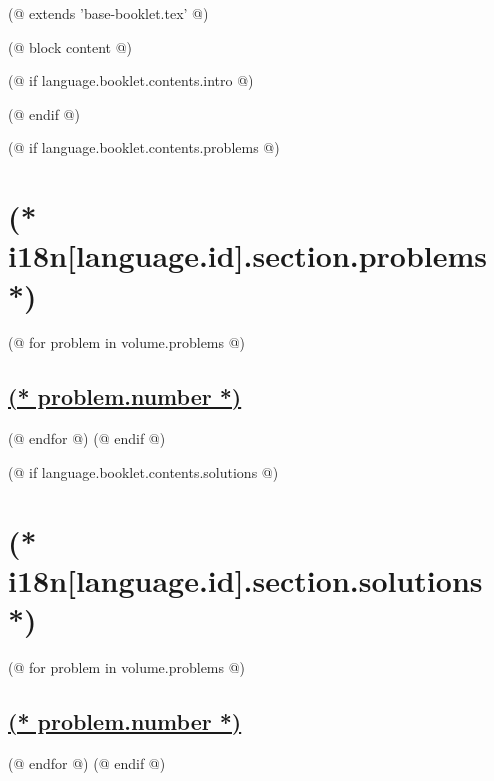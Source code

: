 (@ extends 'base-booklet.tex' @)

(@ block content @)
    \setcounter{volume}{(* volume.number *)}%
    \pagestyle{naboj}

    (@ if language.booklet.contents.intro @)
        \thispagestyle{first}
        \afterpage{\aftergroup\restoregeometry}
        
        \newpage
    (@ endif @)

    (@ if language.booklet.contents.problems @)
        \section{(* i18n[language.id].section.problems *)}
        \pagestyle{problems}
        (@ for problem in volume.problems @)%
            \setcounter{problem}{(* problem.number *)}%
            \hypersetup{linkcolor=black}%
            \subsection{%
                \texorpdfstring{%
                    \hyperref[ssc:(* problem.id *)-answer]{(* problem.number *)}%
                }{%
                    (* problem.number *). (* problem.id *)%
                }%
            }%
            \label{ssc:(* problem.id*)-problem}%
            \hypersetup{linkcolor=colour-link}%
        (@ endfor @)
        \newpage
    (@ endif @)

    (@ if language.booklet.contents.solutions @)
        \section{(* i18n[language.id].section.solutions *)}
        \pagestyle{solutions}
        (@ for problem in volume.problems @)%
            \setcounter{problem}{(* problem.number *)}%
            \setcounter{equation}{0}%
            \setcounter{table}{0}%
            \setcounter{figure}{0}%
            \hypersetup{linkcolor=black}%
            \subsection{%
                \texorpdfstring{%
                    \hyperref[ssc:(* problem.id *)-problem]{(* problem.number *)}%
                }{%
                    (* problem.number *). (* problem.id *)%
                }%
            }%
            \label{ssc:(* problem.id*)-solution}%
            \hypersetup{linkcolor=colour-link}%
        (@ endfor @)
        \newpage
    (@ endif @)

